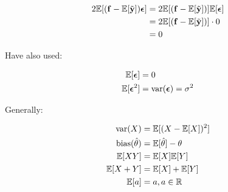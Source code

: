 \begin{align*}
    2\mathbb{E}[(\mathbf{f}-\mathbb{E}[\Tilde{\mathbf{y}}])\boldsymbol{\epsilon}] & =  2 \mathbb{E}[(\mathbf{f}-\mathbb{E}[\Tilde{\mathbf{y}}])]\mathbb{E}[\boldsymbol{\epsilon}] \\
    & = 2 \mathbb{E}[(\mathbf{f}-\mathbb{E}[\Tilde{\mathbf{y}}])] \cdot 0 \\
    & = 0
\end{align*}

Have also used: 

\begin{align*}
    \mathbb{E}[\boldsymbol{\epsilon}] & = 0 \\
    \mathbb{E}[\boldsymbol{\epsilon}^2] & = \text{var}(\boldsymbol{\epsilon}) = \sigma^2 \\
\end{align*}

Generally: 

\begin{align*}
    \text{var}(X) & = \mathbb{E}[(X-\mathbb{E}[X])^2] \\
    \text{bias}(\hat{\theta}) & = \mathbb{E}[\hat{\theta}] - \theta \\
    \mathbb{E}[XY] & = \mathbb{E}[X]\mathbb{E}[Y] \\
    \mathbb{E}[X+Y] & = \mathbb{E}[X] + \mathbb{E}[Y] \\
    \mathbb{E}[a] & = a, a \in \mathbb{R}
\end{align*}
